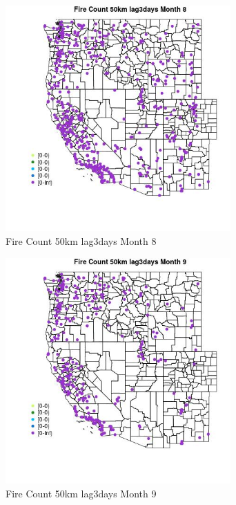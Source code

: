 \begin{figure} 
\centering  
\includegraphics[width=0.77\textwidth]{Code_Outputs/Report_ML_input_PM25_Step4_part_e_de_duplicated_aves_compiled_2019-05-18wNAs_MapObsMo8Fire_Count_50km_lag3days.jpg} 
\caption{\label{fig:Report_ML_input_PM25_Step4_part_e_de_duplicated_aves_compiled_2019-05-18wNAsMapObsMo8Fire_Count_50km_lag3days}Fire Count 50km lag3days Month 8} 
\end{figure} 
 

\clearpage 

\begin{figure} 
\centering  
\includegraphics[width=0.77\textwidth]{Code_Outputs/Report_ML_input_PM25_Step4_part_e_de_duplicated_aves_compiled_2019-05-18wNAs_MapObsMo9Fire_Count_50km_lag3days.jpg} 
\caption{\label{fig:Report_ML_input_PM25_Step4_part_e_de_duplicated_aves_compiled_2019-05-18wNAsMapObsMo9Fire_Count_50km_lag3days}Fire Count 50km lag3days Month 9} 
\end{figure} 
 

